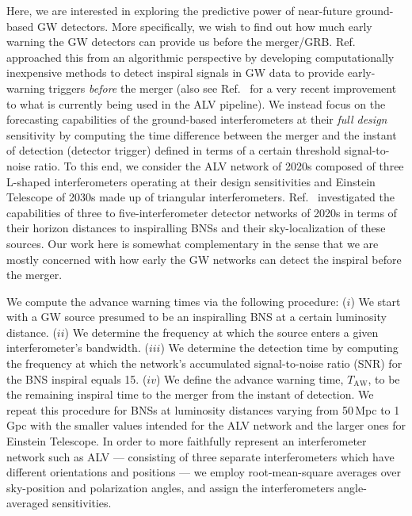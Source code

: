 \documentclass[prd,amsmath,amssymb,aps,floats,amsfonts,notitlepage,superscriptaddress,eqsecnum,nofootinbib,10pt]{revtex4-1}
\begin{document}
Here, we are interested  in exploring the predictive power of near-future ground-based GW detectors. 
More specifically, we wish to find out how much early warning the GW detectors can provide us before the merger/GRB.
Ref.~\cite{Cannon:2011vi} approached this from an algorithmic perspective by developing computationally inexpensive methods to detect inspiral
signals in GW data to provide early-warning triggers \emph{before} the merger (also see Ref.~\cite{Knowles:2018hqq} for a very recent improvement to what is currently being
used in the ALV pipeline).
We instead focus on the forecasting capabilities of the ground-based interferometers at their \emph{full design} sensitivity by computing the time difference
between the merger and the instant of detection (detector trigger) defined in terms of a certain threshold signal-to-noise ratio.
To this end, we consider the ALV network of 2020s composed of three L-shaped interferometers operating at their design sensitivities
and Einstein Telescope of 2030s made up of triangular interferometers.
Ref.~\cite{Nissanke:2012dj} investigated the capabilities of three to five-interferometer detector networks of 2020s in terms of their horizon distances
to inspiralling BNSs and their sky-localization of these sources. Our work here is somewhat complementary in the sense that we are mostly concerned with
how early the GW networks can detect the inspiral before the merger.

We compute the advance warning times via the following procedure: 
(${i}$) We start with a GW source presumed to be an inspiralling BNS at a certain luminosity distance. %
(${ii}$) We determine the frequency at which the source enters a given interferometer's bandwidth. 
(${iii}$) We determine the detection time by computing the frequency at which the network's accumulated signal-to-noise ratio (SNR) for the BNS inspiral equals 15.
($iv$) We define the advance warning time, $T_\text{AW}$, to be the remaining inspiral time to the merger from the instant of detection.
We repeat this procedure for BNSs at luminosity distances varying from 50\,Mpc to 1\,Gpc with the smaller values intended for the ALV network and 
the larger ones for Einstein Telescope.
In order to more faithfully represent an interferometer network such as ALV --- consisting of three separate interferometers which have different
orientations and positions --- we employ root-mean-square averages over sky-position and polarization angles,
and assign the interferometers angle-averaged sensitivities.
\end{document}
